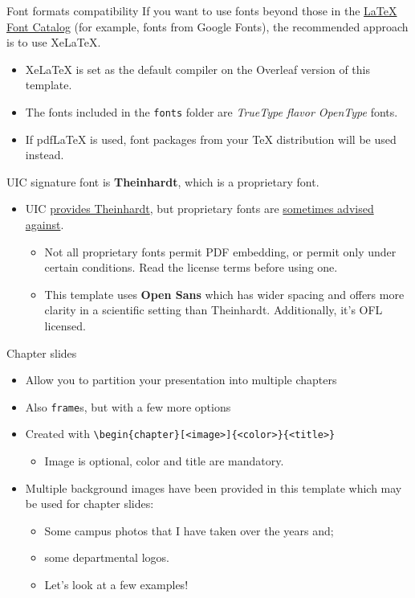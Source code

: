 \documentclass{beamer}
\newcommand{\hrefcol}[2]{\textcolor{uihteal}{\href{#1}{#2}}}
\begin{document}
\begin{frame}{Font formats compatibility}
If you want to use fonts beyond those in the \hrefcol{https://tug.org/FontCatalogue/}{LaTeX Font Catalog} (for example, fonts from Google Fonts), the recommended approach is to use XeLaTeX.
\begin{itemize}
\item XeLaTeX is set as the default compiler on the Overleaf version of this template.
\item The fonts included in the \texttt{fonts} folder are \emph{TrueType flavor OpenType} fonts.
\item If pdfLaTeX is used, font packages from your TeX distribution will be used instead.
\end{itemize}
UIC signature font is \textbf{Theinhardt}, which is a proprietary font.
\begin{itemize}
\item UIC \hrefcol{https://marketing.uic.edu/marketing-toolbox/uic-fonts/}{provides Theinhardt}, but proprietary fonts are \hrefcol{https://studentservices.stanford.edu/my-academics/earn-my-degree/graduate-degree-progress/dissertations-and-theses/prepare-your-work-0\#fontsize}{sometimes advised against}.
\begin{itemize}
    \item Not all proprietary fonts permit PDF embedding, or permit only under certain conditions. Read the license terms before using one.
    \item This template uses \textbf{Open Sans} which has wider spacing and offers more clarity in a scientific setting than Theinhardt. Additionally, it's OFL licensed.
\end{itemize}
\end{itemize}
\end{frame}


\begin{frame}[fragile]{Chapter slides}
\begin{itemize}
\item Allow you to partition your presentation into multiple chapters
\item Also \texttt{frame}s, but with a few more options
\item Created with \verb|\begin{chapter}[<image>]{<color>}{<title>}|
  \begin{itemize}
  \item Image is optional, color and title are mandatory.
  \end{itemize}
\item Multiple background images have been provided in this template which may be used for chapter slides:
  \begin{itemize}
  \item Some campus photos that I have taken over the years and;
  \item some departmental logos.
  \item Let's look at a few examples!
  \end{itemize}
\end{itemize}
\end{frame}
\end{document}
